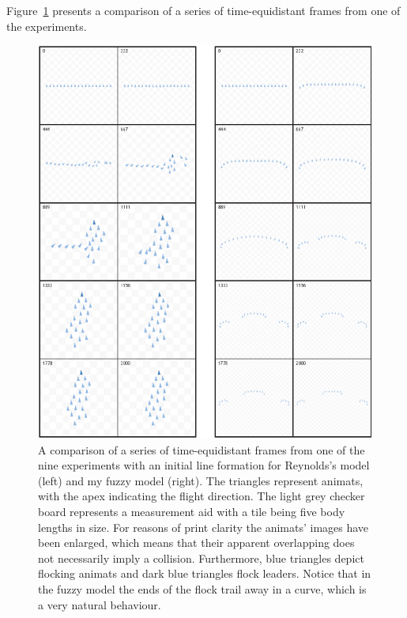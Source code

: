 Figure~\ref{fig:exp:03:01} presents a comparison of a series of time-equidistant frames from one of the experiments. 
%
\begin{figure}%
\null\vspace*{1mm}
\includegraphics{fig[exp0301]}
\par\vspace*{1mm}
\caption{A comparison of a series of time-equidistant frames from one of the nine experiments with an initial line formation for Reynolds's model \cite{reynolds:1999} (left) and my fuzzy model (right). The triangles represent animats, with the apex indicating the flight direction. The light grey checker board represents a measurement aid with a tile being five body lengths in size. For reasons of print clarity the animats' images have been enlarged, which means that their apparent overlapping does not necessarily imply a collision. Furthermore, blue triangles depict flocking animats and dark blue triangles flock leaders. Notice that in the fuzzy model the ends of the flock trail away in a curve, which is a very natural behaviour.}
\label{fig:exp:03:01}
\end{figure}
%
